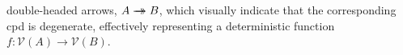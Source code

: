 \documentclass[letterpaper]{article} %
\theoremstyle{plain}
\theoremstyle{definition}
\theoremstyle{remark}
\newcommand{\tto}{\rightarrow\mathrel{\mspace{-15mu}}\rightarrow}
\newcommand{\V}{\mathcal V}
\begin{document}
double-headed arrows, $A \tto B$, which visually indicate 
that the corresponding cpd is degenerate, effectively representing a deterministic
function $f : \V(A) \to \V(B)$. 
\end{document}
